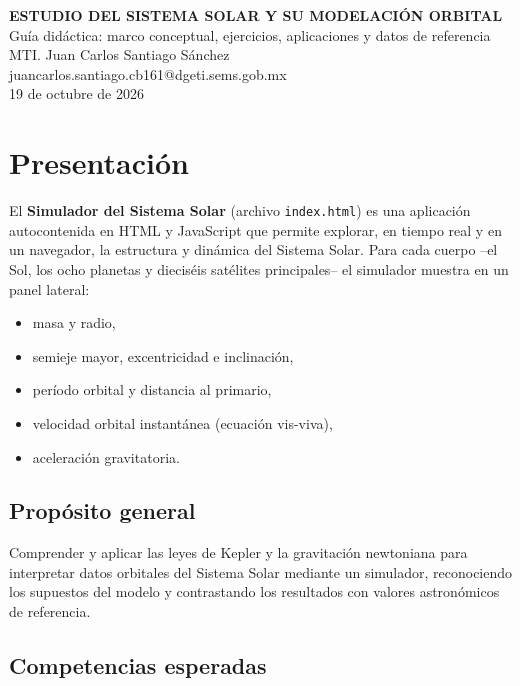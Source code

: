 \documentclass[11pt,a4paper]{article}
\makeatletter
\newcommand{\autor}{MTI. Juan Carlos Santiago Sánchez}
\newcommand{\correo}{juancarlos.santiago.cb161@dgeti.sems.gob.mx}
\newcommand{\fechaDoc}{19 de octubre de 2026}
\theoremstyle{definition}
\makeatother
\begin{document}
\begin{center}
{\LARGE\bfseries ESTUDIO DEL SISTEMA SOLAR Y SU MODELACIÓN ORBITAL}\\[0.4em]
{\large Guía didáctica: marco conceptual, ejercicios, aplicaciones y datos de referencia}\\[1.2em]
\autor\\
\correo\\[0.7em]
\fechaDoc
\end{center}

\tableofcontents
\newpage

\section{Presentación}

El \textbf{Simulador del Sistema Solar} (archivo \texttt{index.html}) es una aplicación autocontenida en HTML y JavaScript que permite explorar, en tiempo real y en un navegador, la estructura y dinámica del Sistema Solar. Para cada cuerpo --el Sol, los ocho planetas y dieciséis satélites principales-- el simulador muestra en un panel lateral:

\begin{itemize}[leftmargin=*,itemsep=2pt]
  \item masa y radio,
  \item semieje mayor, excentricidad e inclinación,
  \item período orbital y distancia al primario,
  \item velocidad orbital instantánea (ecuación vis-viva),
  \item aceleración gravitatoria.
\end{itemize}

\subsection*{Propósito general}

Comprender y aplicar las leyes de Kepler y la gravitación newtoniana para interpretar datos orbitales del Sistema Solar mediante un simulador, reconociendo los supuestos del modelo y contrastando los resultados con valores astronómicos de referencia.

\subsection*{Competencias esperadas}
\end{document}
